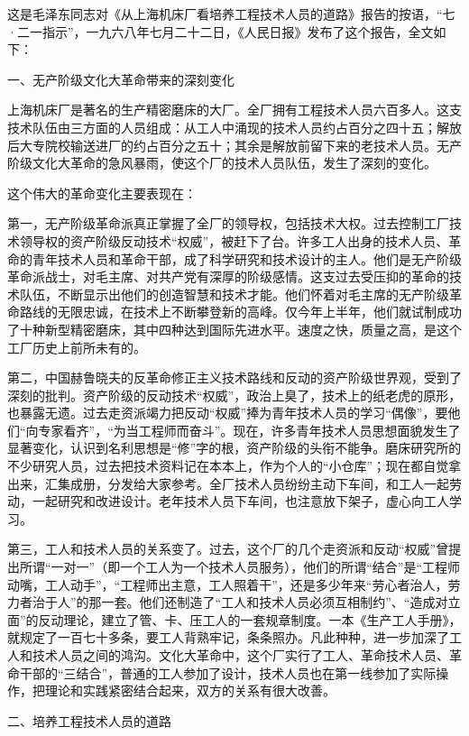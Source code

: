 \begin{maonote}
这是毛泽东同志对《从上海机床厂看培养工程技术人员的道路》报告的按语，“七·二一指示”，一九六八年七月二十二日，《人民日报》发布了这个报告，全文如下：

一、无产阶级文化大革命带来的深刻变化

上海机床厂是著名的生产精密磨床的大厂。全厂拥有工程技术人员六百多人。这支技术队伍由三方面的人员组成：从工人中涌现的技术人员约占百分之四十五；解放后大专院校输送进厂的约占百分之五十；其余是解放前留下来的老技术人员。无产阶级文化大革命的急风暴雨，使这个厂的技术人员队伍，发生了深刻的变化。

这个伟大的革命变化主要表现在：

第一，无产阶级革命派真正掌握了全厂的领导权，包括技术大权。过去控制工厂技术领导权的资产阶级反动技术“权威”，被赶下了台。许多工人出身的技术人员、革命的青年技术人员和革命干部，成了科学研究和技术设计的主人。他们是无产阶级革命派战士，对毛主席、对共产党有深厚的阶级感情。这支过去受压抑的革命的技术队伍，不断显示出他们的创造智慧和技术才能。他们怀着对毛主席的无产阶级革命路线的无限忠诚，在技术上不断攀登新的高峰。仅今年上半年，他们就试制成功了十种新型精密磨床，其中四种达到国际先进水平。速度之快，质量之高，是这个工厂历史上前所未有的。

第二，中国赫鲁晓夫的反革命修正主义技术路线和反动的资产阶级世界观，受到了深刻的批判。资产阶级的反动技术“权威”，政治上臭了，技术上的纸老虎的原形，也暴露无遗。过去走资派竭力把反动“权威”捧为青年技术人员的学习“偶像”，要他们“向专家看齐”，“为当工程师而奋斗”。现在，许多青年技术人员思想面貌发生了显著变化，认识到名利思想是“修”字的根，资产阶级的头衔不能争。磨床研究所的不少研究人员，过去把技术资料记在本本上，作为个人的“小仓库”；现在都自觉拿出来，汇集成册，分发给大家参考。全厂技术人员纷纷主动下车间，和工人一起劳动，一起研究和改进设计。老年技术人员下车间，也注意放下架子，虚心向工人学习。

第三，工人和技术人员的关系变了。过去，这个厂的几个走资派和反动“权威”曾提出所谓“一对一”（即一个工人为一个技术人员服务），他们的所谓“结合”是“工程师动嘴，工人动手”，“工程师出主意，工人照着干”，还是多少年来“劳心者治人，劳力者治于人”的那一套。他们还制造了“工人和技术人员必须互相制约”、“造成对立面”的反动理论，建立了管、卡、压工人的一套规章制度。一本《生产工人手册》，就规定了一百七十多条，要工人背熟牢记，条条照办。凡此种种，进一步加深了工人和技术人员之间的鸿沟。文化大革命中，这个厂实行了工人、革命技术人员、革命干部的“三结合”，普通的工人参加了设计，技术人员也在第一线参加了实际操作，把理论和实践紧密结合起来，双方的关系有很大改善。

二、培养工程技术人员的道路


\end{maonote}
